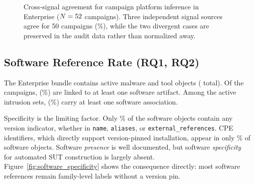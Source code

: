 \documentclass[sigconf]{acmart}
\begin{document}
\begin{figure}[!tb]
\centering
\resizebox{0.82\columnwidth}{!}{}
\caption{Cross-signal agreement for campaign platform inference in Enterprise ($N=52{}$ campaigns). Three independent signal sources agree for 50 campaigns (\evidenceconvergenceratepct\%), while the two divergent cases are preserved in the audit data rather than normalized away.}\label{fig:evidence_convergence}
\end{figure}

\subsection{Software Reference Rate (RQ1, RQ2)}

The Enterprise bundle contains \enterpriseactivemalwarecount{} active malware and \enterpriseactivetoolcount{} tool objects (\enterpriseactivesoftwarecount{} total). Of the \enterpriseactivecampaigncount{} campaigns, \enterprisecampaignswithsoftwarecount{} (\enterprisecampaignswithsoftwarepercentage\%) are linked to at least one software artifact. Among the \enterpriseactiveintrusionsetcount{} active intrusion sets, \enterpriseintrusionsetswithsoftwarecount{} (\enterpriseintrusionsetswithsoftwarepercentage\%) carry at least one software association.

Specificity is the limiting factor. Only \softwarewithversionsignalpercentage\% of the \enterpriseactivesoftwarecount{} software objects contain any version indicator, whether in \texttt{name}, \texttt{aliases}, or \texttt{external\_references}. CPE identifiers, which directly support version-pinned installation, appear in only \softwarewithcpepercentage\% of software objects. Software \emph{presence} is well documented, but software \emph{specificity} for automated SUT construction is largely absent. Figure~\ref{fig:software_specificity} shows the consequence directly: most software references remain family-level labels without a version pin.
\end{document}
